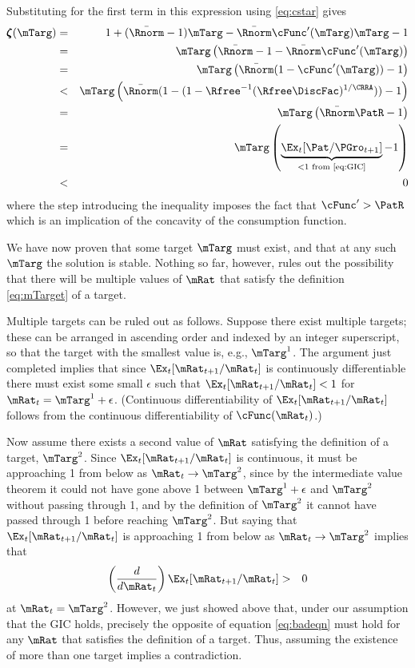 \documentclass[titlepage]{\econtex}\providecommand{\texname}{BufferStockTheory}%
\begin{document}
{Substituting for the first term in this expression using
\eqref{eq:cstar} gives
\begin{eqnarray*}
\numFunc(\mTarg) & = & 1+(\bar{\Rnorm}-1)\mTarg- \bar{\Rnorm}\cFunc^{\prime}(\mTarg)\mTarg - 1 \\
& = & \mTarg\left(\bar{\Rnorm}-1-\bar{\Rnorm}\cFunc^{\prime}(\mTarg)\right) \\
& = & \mTarg\left(\bar{\Rnorm}(1-\cFunc^{\prime}(\mTarg))-1\right) \\
& < & \mTarg\left(\bar{\Rnorm}(1-(1-{\Rfree}^{-1}(\Rfree\DiscFac)^{1/%
\CRRA}))-1\right) \\
& = & \mTarg\left(\bar{\Rnorm}\PatR-1%
\right) \\
& = & \mTarg\left(\underbrace{\Ex_{t}[{\Pat}/{\PGro}_{t+1}]}_{<
1\text{~from \eqref{eq:GIC}}}-1\right) \\
& < & 0
\end{eqnarray*}
where the step introducing the inequality imposes the fact that $\cFunc^{\prime} > \PatR$ which is an
implication of the concavity of the consumption function.

We have now proven that some target $\mTarg$ must exist, and that at any such
$\mTarg$ the solution is stable. Nothing so far, however, rules
out the possibility that there will be multiple values of $\mRat$ that
satisfy the definition \eqref{eq:mTarget} of a target.

Multiple targets can be ruled out as follows. Suppose there exist
multiple targets; these can be arranged in ascending order and indexed
by an integer superscript, so that the target with the smallest value is,
e.g., $\mTarg^{1}$. The argument just completed implies that since
$\Ex_{t}[{\mRat}_{t+1}/\mRat_{t}]$ is continuously differentiable
there must exist some small $\epsilon$ such that
$\Ex_{t}[{\mRat}_{t+1}/\mRat_{t}] < 1$ for $\mRat_{t} =
\mTarg^{1}+\epsilon$. (Continuous differentiability of
$\Ex_{t}[{\mRat}_{t+1}/\mRat_{t}]$ follows from the continuous
differentiability of $\cFunc(\mRat_{t})$.) 

Now assume there exists a second value of $\mRat$ satisfying the
definition of a target, $\mTarg^{2}$. Since
$\Ex_{t}[{\mRat}_{t+1}/\mRat_{t}]$ is continuous, it must be
approaching 1 from below as $\mRat_{t} \rightarrow \mTarg^{2}$, since
by the intermediate value theorem it could not have gone above 1
between $\mTarg^{1}+\epsilon$ and $\mTarg^{2}$ without passing through
1, and by the definition of $\mTarg^{2}$ it cannot have passed through
1 before reaching $\mTarg^{2}$.  But saying that
$\Ex_{t}[{\mRat}_{t+1}/\mRat_{t}]$ is approaching 1 from below as
$\mRat_{t} \rightarrow \mTarg^{2}$ implies that
\begin{eqnarray}
\left(\frac{d}{d\mRat_{t}}\right)\Ex_{t}[{\mRat}_{t+1}/\mRat_{t}] & > & 0
\label{eq:badeqn}
\end{eqnarray}
at $\mRat_{t}=\mTarg^{2}$. However, we just showed above that, under
our assumption that the GIC holds, precisely the opposite of equation
\eqref{eq:badeqn} must hold for any $\mRat$ that satisfies the definition
of a target. Thus, assuming the existence of more than one target
implies a contradiction.

}
\end{document}

